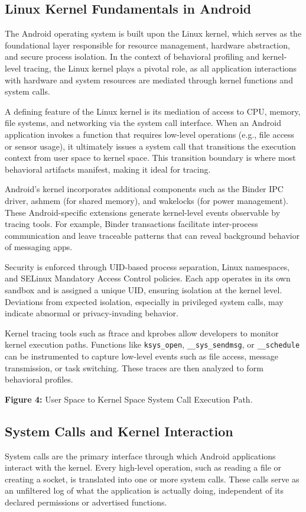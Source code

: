 \documentclass[a4paper,12pt]{report}
\begin{document}
\subsection{Linux Kernel Fundamentals in Android}
The Android operating system is built upon the Linux kernel, which serves as the foundational layer responsible for resource management, hardware abstraction, and secure process isolation. In the context of behavioral profiling and kernel-level tracing, the Linux kernel plays a pivotal role, as all application interactions with hardware and system resources are mediated through kernel functions and system calls.

A defining feature of the Linux kernel is its mediation of access to CPU, memory, file systems, and networking via the system call interface. When an Android application invokes a function that requires low-level operations (e.g., file access or sensor usage), it ultimately issues a system call that transitions the execution context from user space to kernel space. This transition boundary is where most behavioral artifacts manifest, making it ideal for tracing.

Android’s kernel incorporates additional components such as the Binder IPC driver, ashmem (for shared memory), and wakelocks (for power management). These Android-specific extensions generate kernel-level events observable by tracing tools. For example, Binder transactions facilitate inter-process communication and leave traceable patterns that can reveal background behavior of messaging apps.

Security is enforced through UID-based process separation, Linux namespaces, and SELinux Mandatory Access Control policies. Each app operates in its own sandbox and is assigned a unique UID, ensuring isolation at the kernel level. Deviations from expected isolation, especially in privileged system calls, may indicate abnormal or privacy-invading behavior.

Kernel tracing tools such as ftrace and kprobes allow developers to monitor kernel execution paths. Functions like \texttt{ksys\_open}, \texttt{\_\_sys\_sendmsg}, or \texttt{\_\_schedule} can be instrumented to capture low-level events such as file access, message transmission, or task switching. These traces are then analyzed to form behavioral profiles.

\textbf{Figure 4:} User Space to Kernel Space System Call Execution Path.

\subsection{System Calls and Kernel Interaction}
System calls are the primary interface through which Android applications interact with the kernel. Every high-level operation, such as reading a file or creating a socket, is translated into one or more system calls. These calls serve as an unfiltered log of what the application is actually doing, independent of its declared permissions or advertised functions.
\end{document}
